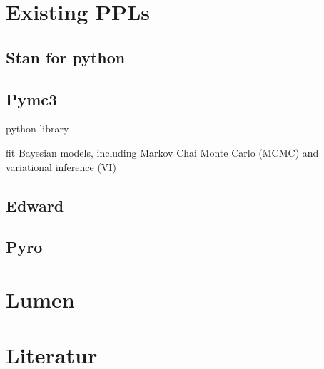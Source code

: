 \documentclass{article}
\begin{document}

\section{Existing PPLs}

\subsection{Stan for python}

\subsection{Pymc3}

python library

fit Bayesian models, including Markov Chai Monte Carlo (MCMC) and variational inference (VI)


\subsection{Edward}

\subsection{Pyro}


\section{Lumen}

\listoffigures
        
\section{Literatur}



\end{document}
